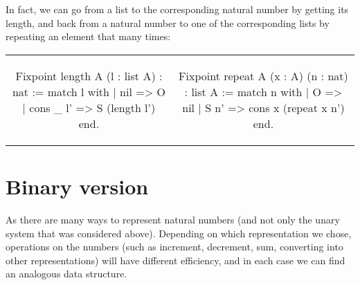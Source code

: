 \documentclass{article}
\newenvironment{no_padding_center}
    {\parskip=0pt\par\nopagebreak\centering}
    {\par\noindent}
\begin{document}
\begin{center}
\end{center}

In fact, we can go from a list to the corresponding natural number by getting its length, and back from a natural number to one of the corresponding lists by repeating an element that many times:

\begin{no_padding_center}
    \begin{tabular}{c c}
        \begin{coq}
Fixpoint length {A} (l : list A) : nat :=
  match l with
  | nil => O
  | cons _ l' => S (length l')
  end.
        \end{coq} &
        \begin{coq}
Fixpoint repeat {A} (x : A) (n : nat) : list A :=
  match n with
  | O => nil
  | S n' => cons x (repeat x n')
  end.
        \end{coq}
    \end{tabular}
\end{no_padding_center}

\section{Binary version}

As there are many ways to represent natural numbers (and not only the unary system that was considered above). Depending on which representation we chose, operations on the numbers (such as increment, decrement, sum, converting into other representations) will have different efficiency, and in each case we can find an analogous data structure.
\end{document}

